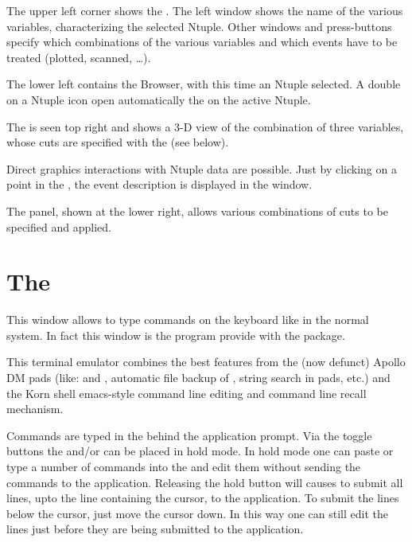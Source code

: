 
\begin{UL}
\item The upper left corner shows the \NV.
      The left window shows the name of the various variables, characterizing
      the selected Ntuple. Other windows and press-buttons specify which
      combinations of the various variables and which events
      have to be treated (plotted, scanned, \ldots).
\item The lower left contains the \PAWPP{} Browser, with this time an Ntuple
      selected. A double on a Ntuple icon
      open automatically the \NV{} on the active Ntuple.
\item The \GW{} is seen top right and shows a 3-D view
      of the combination of three variables, whose cuts are
      specified with the \CE{} (see below).
\item Direct graphics interactions with Ntuple data are possible. Just
      by clicking on a point in the  \GW, the event description is displayed
      in the \PL{} window.
\item The \CE{} panel, shown at the lower right, allows
      various combinations of cuts to be specified and applied.
\end{UL}

\clearpage

\section{The \EW}


This window allows to type commands on the keyboard like in the normal \XPAW{}
system. In fact this window is the  program provide with the \KUIP{}
package.

This terminal emulator combines the best features from the (now defunct) Apollo
DM pads (like: \IP{} and \TP, automatic file backup of \TP, string search in 
pads, etc.) and the Korn shell emacs-style command line editing and command line
recall mechanism.

Commands are typed in the \IP{}  behind the application prompt. Via the
toggle buttons   the \IP{} and/or \TP{} can be placed in hold
mode. In hold mode one can paste or type a number of commands into the \IP{} and
edit them without sending the commands to the application. Releasing the hold 
button will causes  to submit all lines, upto the line containing 
the cursor, to the application. To submit the lines below the cursor, just move
the cursor down. In this way one can still edit the lines just before they are
being submitted to the application.


